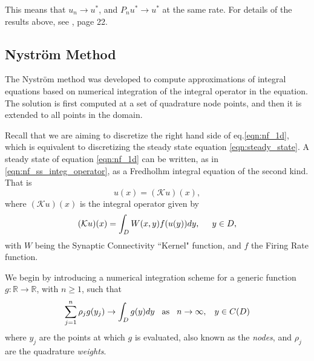 \documentclass{uonmathreport}
\begin{document}
This means that $u_n \rightarrow u^*$, and $P_n u^* \rightarrow u^*$ at the same rate. For details of the results above, see \cite{atkinson1992survey}, page 22.

\subsection{Nystr\"om Method}
\label{subsec: Nystrom}
The Nystr\"om method was developed to compute approximations of integral equations based on numerical integration of the integral operator in the equation. The solution is first computed at a set of quadrature node points, and then it is extended to all points in the domain.

Recall that we are aiming to discretize the right hand side of eq.\ref{eqn:nf_1d}, which is equivalent to discretizing the steady state equation \ref{eqn:steady_state}. A steady state of equation \ref{eqn:nf_1d} can be written, as in \ref{eqn:nf_ss_integ_operator}, as a Fredholhm integral equation of the second kind. That is
\begin{equation}\label{eqn:nyst_ss}
u(x) = (\mathcal{K}u)(x),
\end{equation}
where $(\mathcal{K}u)(x)$ is the integral operator given by 
\begin{equation}\label{eqn:nyst_ss_integ_operator}
(\mathcal{K}u)(x) = \int_{D} W(x,y)f(u(y))dy, \hspace{5mm} y \in D,
\end{equation}
with $W$ being the Synaptic Connectivity ``Kernel" function, and $f$ the Firing Rate function.

We begin by introducing a numerical integration scheme for a generic function $g: \mathbb{R} \rightarrow \mathbb{R}$, with $n \geq 1$, such that
\begin{equation}
\sum_{j=1}^{n} \rho_{j}g(y_{j}) \rightarrow \int_{D} g(y) dy \hspace{3mm} \textnormal{as} \hspace{3mm} n\rightarrow \infty, \hspace{3mm} y \in C(D)
\end{equation}
where $y_{j}$ are the points at which $g$ is evaluated, also known as the \textit{nodes}, and $\rho_{j}$ are the quadrature \textit{weights}.
\end{document}
